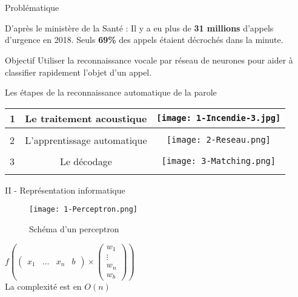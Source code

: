 \section{}


\begin{frame}
\titlepage
\end{frame}

\begin{frame}{Problématique}
\begin{alert}{D'après le ministère de la Santé : }
Il y a eu plus de \textbf{31 millions} d'appels d'urgence en 2018. Seuls \textbf{69\%} des appels étaient décrochés dans la minute.
\end{alert}
\begin{block}{Objectif}
Utiliser la reconnaissance vocale par réseau de neurones pour aider à classifier rapidement l'objet d'un appel.
\end{block}
\end{frame}



\begin{frame}{Les étapes de la reconnaissance automatique de la parole}
\begin{tabular}{ l || c | c | }
    1 & Le traitement acoustique  & \texttt{[image: 1-Incendie-3.jpg]} \\ \hline \\
    2 & L'apprentissage automatique & \texttt{[image: 2-Reseau.png]} \\ \hline \\
    3 & Le décodage & \texttt{[image: 3-Matching.png]} \\ \hline \\

\end{tabular}
\end{frame}




\begin{frame}{II - Représentation informatique}
\begin{figure}
	\centering
    \texttt{[image: 1-Perceptron.png]}
	\caption{Schéma d'un perceptron}	
\end{figure}
\begin{multicols}{2}
$
f
\left(
\begin{pmatrix}
x_1 & \ldots & x_n & b
\end{pmatrix}
\times
\begin{pmatrix}
w_1 \\
\vdots \\
w_n \\
w_b
\end{pmatrix}
\right)
$ \\
La complexité est en $O(n)$
\columnbreak

\end{multicols}
\end{frame}